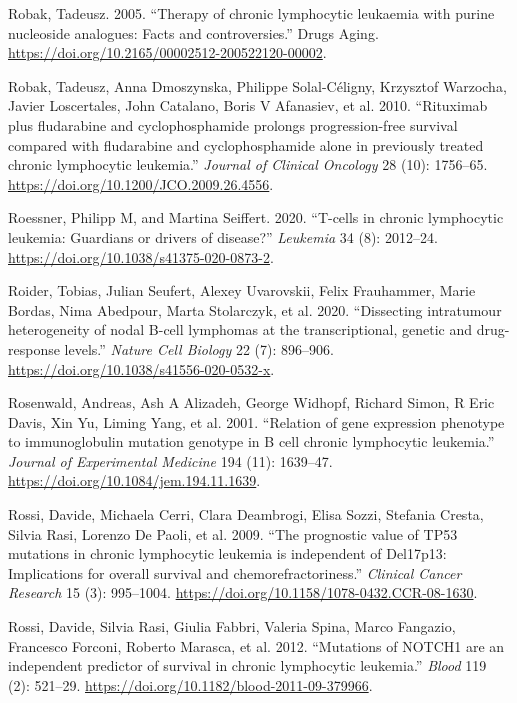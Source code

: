 \documentclass[11pt, a4paper, twosided]{book}
\newenvironment{CSLReferences}%
  {}%
  {\par}
\begin{document}
\begin{CSLReferences}{1}{0}
\leavevmode{}%
Robak, Tadeusz. 2005. {``{Therapy of chronic lymphocytic leukaemia with purine nucleoside analogues: Facts and controversies}.''} Drugs Aging. \url{https://doi.org/10.2165/00002512-200522120-00002}.

\leavevmode{}%
Robak, Tadeusz, Anna Dmoszynska, Philippe Solal-Céligny, Krzysztof Warzocha, Javier Loscertales, John Catalano, Boris V Afanasiev, et al. 2010. {``{Rituximab plus fludarabine and cyclophosphamide prolongs progression-free survival compared with fludarabine and cyclophosphamide alone in previously treated chronic lymphocytic leukemia}.''} \emph{Journal of Clinical Oncology} 28 (10): 1756--65. \url{https://doi.org/10.1200/JCO.2009.26.4556}.

\leavevmode{}%
Roessner, Philipp M, and Martina Seiffert. 2020. {``{T-cells in chronic lymphocytic leukemia: Guardians or drivers of disease?}''} \emph{Leukemia} 34 (8): 2012--24. \url{https://doi.org/10.1038/s41375-020-0873-2}.

\leavevmode{}%
Roider, Tobias, Julian Seufert, Alexey Uvarovskii, Felix Frauhammer, Marie Bordas, Nima Abedpour, Marta Stolarczyk, et al. 2020. {``{Dissecting intratumour heterogeneity of nodal B-cell lymphomas at the transcriptional, genetic and drug-response levels}.''} \emph{Nature Cell Biology} 22 (7): 896--906. \url{https://doi.org/10.1038/s41556-020-0532-x}.

\leavevmode{}%
Rosenwald, Andreas, Ash A Alizadeh, George Widhopf, Richard Simon, R Eric Davis, Xin Yu, Liming Yang, et al. 2001. {``{Relation of gene expression phenotype to immunoglobulin mutation genotype in B cell chronic lymphocytic leukemia}.''} \emph{Journal of Experimental Medicine} 194 (11): 1639--47. \url{https://doi.org/10.1084/jem.194.11.1639}.

\leavevmode{}%
Rossi, Davide, Michaela Cerri, Clara Deambrogi, Elisa Sozzi, Stefania Cresta, Silvia Rasi, Lorenzo De Paoli, et al. 2009. {``{The prognostic value of TP53 mutations in chronic lymphocytic leukemia is independent of Del17p13: Implications for overall survival and chemorefractoriness}.''} \emph{Clinical Cancer Research} 15 (3): 995--1004. \url{https://doi.org/10.1158/1078-0432.CCR-08-1630}.

\leavevmode{}%
Rossi, Davide, Silvia Rasi, Giulia Fabbri, Valeria Spina, Marco Fangazio, Francesco Forconi, Roberto Marasca, et al. 2012. {``{Mutations of NOTCH1 are an independent predictor of survival in chronic lymphocytic leukemia}.''} \emph{Blood} 119 (2): 521--29. \url{https://doi.org/10.1182/blood-2011-09-379966}.


\end{CSLReferences}
\end{document}
